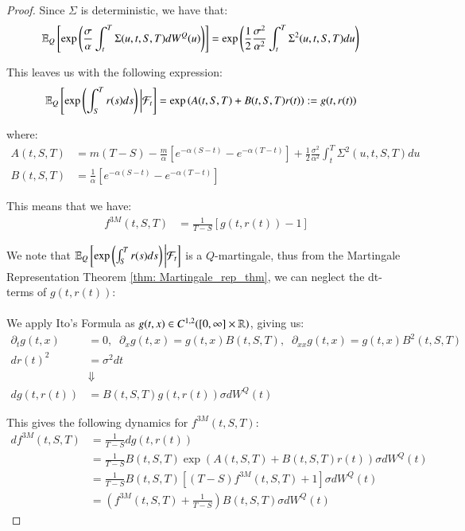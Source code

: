 \begin{proof}
Since $\Sigma$ is deterministic, we have that: 
\begin{align*}
\mathbb{E}_{Q}\left[
\exp\left(
\frac{\sigma}{\alpha}\int_{t}^{T}\Sigma(u,t,S,T)dW^{Q}(u)
\right)
\right]
&= 
\exp\left(
\frac{1}{2}\frac{\sigma^{2}}{\alpha^{2}}\int_{t}^{T}\Sigma^{2}(u,t,S,T)du
\right)
\end{align*}

This leaves us with the following expression:
\begin{align}
\label{eq: a_hat_3M_SOFR}
 \mathbb{E}_{Q}\left[
\exp\left(
\int_{S}^{T}r(s)ds
\right)\bigg{|}\mathcal{F}_{t}
\right] 
&= 
\exp\left(
A(t,S,T) + B(t,S,T)r(t)
\right):= g(t,r(t))
\end{align}

where: 
\begin{align*}
A(t,S,T) &= m(T-S) - \frac{m}{\alpha}\left[
e^{-\alpha(S-t)} - e^{-\alpha(T-t)}
\right] + \frac{1}{2}\frac{\sigma^{2}}{\alpha^{2}}\int_{t}^{T}\Sigma^{2}(u,t,S,T)du \\
B(t,S,T) &= \frac{1}{\alpha}\left[
e^{-\alpha(S-t)} - e^{-\alpha(T-t)}
\right]
\end{align*}

This means that we have: 
\begin{align}
\label{eq: Vasicek_3M_SOFR_closed_formula}
f^{3M}(t,S,T) &= \frac{1}{T-S}\left[
g(t,r(t)) - 1
\right]    
\end{align}

We note that $\mathbb{E}_{Q}\left[
\exp\left(
\int_{S}^{T}r(s)ds
\right)\bigg{|}\mathcal{F}_{t}
\right]$ is a $Q$-martingale, thus from the Martingale Representation Theorem \ref{thm: Martingale_rep_thm}, we can neglect the dt-terms of $g(t,r(t))$:
\\~\\
We apply Ito's Formula as $g(t,x) \in C^{1,2}([0,\infty]\times \mathbb{R})$, giving us: 
\begin{align*}
\partial_{t}g(t,x) &= 0, \;\; \partial_{x}g(t,x) = g(t,x)B(t,S,T), \;\; 
\partial_{xx}g(t,x) = g(t,x)B^{2}(t,S,T) \\ 
dr(t)^{2} &= \sigma^{2}dt \\ 
&\Downarrow \\ 
dg(t,r(t)) &= B(t,S,T)g(t,r(t))\sigma dW^{Q}(t)
\end{align*}

\newpage 

This gives the following dynamics for $f^{3M}(t,S,T)$:
\begin{align*}
df^{3M}(t,S,T) &= \frac{1}{T-S}dg(t,r(t)) \\ 
&= \frac{1}{T-S}B(t,S,T)\exp\left(A(t,S,T) + B(t,S,T)r(t)\right)\sigma dW^{Q}(t)\\ 
&= 
\frac{1}{T-S}B(t,S,T)\left[
(T-S)f^{3M}(t,S,T) +1
\right]\sigma dW^{Q}(t) \\ 
&= 
\left(
f^{3M}(t,S,T) + \frac{1}{T-S}
\right)B(t,S,T)\sigma dW^{Q}(t)
\end{align*}
\end{proof}


